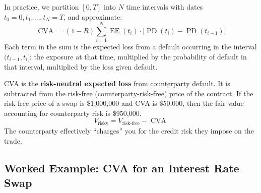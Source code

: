 \documentclass[11pt, a4paper]{article}
\theoremstyle{definition}
\theoremstyle{plain}
\theoremstyle{remark}
\newcommand{\CVA}{\operatorname{CVA}}
\newcommand{\EE}{\operatorname{EE}}
\newcommand{\PD}{\operatorname{PD}}
\begin{document}
In practice, we partition $[0, T]$ into $N$ time intervals with dates
$t_0 = 0, t_1, \ldots, t_N = T$, and approximate:
\begin{equation}\label{eq:cva-discrete}
    \CVA = (1 - R)\sum_{i=1}^{N} \EE(t_i)\cdot\bigl[\PD(t_i) - \PD(t_{i-1})\bigr]
\end{equation}
Each term in the sum is the expected loss from a default occurring in the interval
$(t_{i-1}, t_i]$: the exposure at that time, multiplied by the probability of default
in that interval, multiplied by the loss given default.

\begin{keyresult}
CVA is the \textbf{risk-neutral expected loss} from counterparty default.
It is subtracted from the risk-free (counterparty-risk-free) price of the contract.
If the risk-free price of a swap is \$1{,}000{,}000 and CVA is \$50{,}000,
then the fair value accounting for counterparty risk is \$950{,}000.
\[
    V_{\text{risky}} = V_{\text{risk-free}} - \CVA
\]
The counterparty effectively ``charges'' you for the credit risk they impose on the trade.
\end{keyresult}

\subsection{Worked Example: CVA for an Interest Rate Swap}
\end{document}
